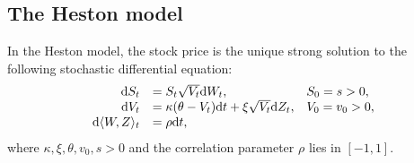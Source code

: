 \subsection{The Heston model}
In the Heston model, the stock price is the unique strong solution to the following stochastic differential equation:
\begin{equation}\label{eq:Heston}
\begin{array}{rll}
\mathrm{d} S_t & = S_t \sqrt{V_t} \mathrm{d} W_t, & S_0 = s>0,\\
\mathrm{d} V_t & = \kappa(\theta-V_t)\mathrm{d} t + \xi\sqrt{V_t}\mathrm{d} Z_t, & V_0 = v_0>0,\\
\mathrm{d} \langle W, Z\rangle_t & = \rho \mathrm{d} t,
\end{array}
\end{equation}
where $\kappa, \xi, \theta, v_0, s>0$ and the correlation parameter $\rho$ lies in $[-1,1]$.
